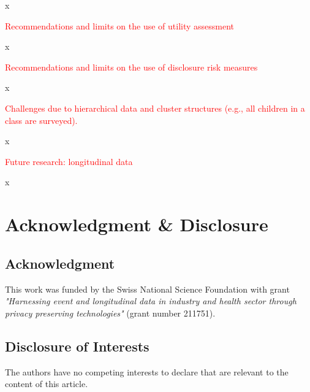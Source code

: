 \documentclass{article}
\begin{document}
x

\textcolor{red}{Recommendations and limits on the use of utility assessment}

x

\textcolor{red}{Recommendations and limits on the use of disclosure risk measures}

x

\textcolor{red}{Challenges due to hierarchical data and cluster structures (e.g., all children in a class are surveyed).}

x

\textcolor{red}{Future research: longitudinal data}

x

\section*{Acknowledgment \& Disclosure} 
\subsection*{Acknowledgment} 
This work was funded by the Swiss National Science Foundation with grant \textit{"Harnessing event and longitudinal data in industry and health sector through privacy preserving technologies"} (grant number 211751).

\subsection*{Disclosure of Interests} 
The authors have no competing interests to declare that are relevant to the content of this article. 




\end{document}
